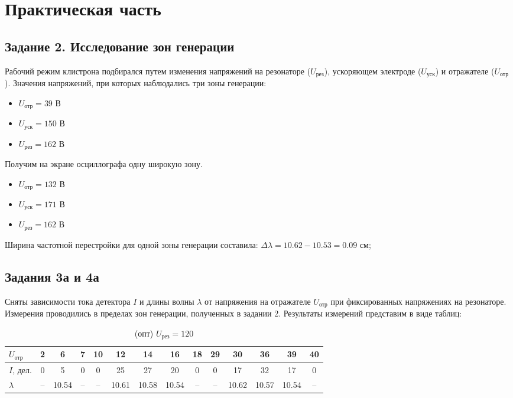 \section{Практическая часть}

\subsection{Задание 2. Исследование зон генерации}

Рабочий режим клистрона подбирался путем изменения напряжений на резонаторе (\(U_{\text{рез}}\)), ускоряющем электроде (\(U_{\text{уск}}\)) и отражателе (\(U_{\text{отр}}\)). Значения напряжений, при которых наблюдались три зоны генерации:
\begin{itemize}
	\item \(U_{\text{отр}} = 39\) В
	\item \(U_{\text{уск}} = 150\) В
	\item \(U_{\text{рез}} = 162\) В
\end{itemize}

Получим на экране осциллографа одну широкую зону. 
\begin{itemize}
	\item \(U_{\text{отр}} = 132\) В
	\item \(U_{\text{уск}} = 171\) В
	\item \(U_{\text{рез}} = 162\) В
\end{itemize}
Ширина частотной перестройки для одной зоны генерации составила: \(\Delta\lambda = 10.62 - 10.53 = 0.09\) см;

\subsection{Задания 3а и 4а}

Сняты зависимости тока детектора \(I\) и длины волны \(\lambda\) от напряжения на отражателе \(U_{\text{отр}}\) при фиксированных напряжениях на резонаторе. Измерения проводились в пределах зон генерации, полученных в задании 2. Результаты измерений представим в виде таблиц:

\begin{table}[h!]
	\centering
	\footnotesize
	\begin{tabular}{|l|c|c|c|c|c|c|c|c|c|c|c|c|c|}
		\hline
		\(U_{\text{отр}}\) & 2 & 6 & 7 & 10 & 12 & 14 & 16 & 18 & 29 & 30 & 36 & 39 & 40  \\ \hline
		\(I\), дел. & 0 & 5 & 0 & 0 & 25 & 27 & 20 & 0 & 0 & 17 & 32 & 17 & 0 \\ \hline
		\(\lambda\) & -- & 10.54 & -- & -- & 10.61 & 10.58 & 10.54 & -- & -- & 10.62 & 10.57 & 10.54 & -- \\ \hline
	\end{tabular}
	\caption{(опт) \(U_{\text{рез}} = 120\)}
\end{table}

